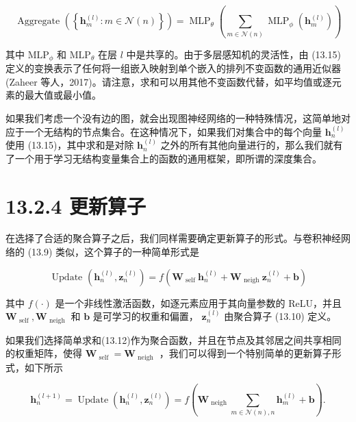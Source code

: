 \documentclass[10pt]{report}
\begin{document}
\[
\text{ Aggregate }\left( \left\{  {{\mathbf{h}}_{m}^{\left( l\right) } : m \in  \mathcal{N}\left( n\right) }\right\}  \right)  = {\operatorname{MLP}}_{\theta }\left( {\mathop{\sum }\limits_{{m \in  \mathcal{N}\left( n\right) }}{\operatorname{MLP}}_{\phi }\left( {\mathbf{h}}_{m}^{\left( l\right) }\right) }\right)  \tag{13.15}
\]

其中 \({\mathrm{{MLP}}}_{\phi }\) 和 \({\mathrm{{MLP}}}_{\theta }\) 在层 \(l\) 中是共享的。由于多层感知机的灵活性，由 (13.15) 定义的变换表示了任何将一组嵌入映射到单个嵌入的排列不变函数的通用近似器(Zaheer 等人，2017)。请注意，求和可以用其他不变函数代替，如平均值或逐元素的最大值或最小值。

如果我们考虑一个没有边的图，就会出现图神经网络的一种特殊情况，这简单地对应于一个无结构的节点集合。在这种情况下，如果我们对集合中的每个向量 \({\mathbf{h}}_{n}^{\left( l\right) }\) 使用 (13.15)，其中求和是对除 \({\mathbf{h}}_{n}^{\left( l\right) }\) 之外的所有其他向量进行的，那么我们就有了一个用于学习无结构变量集合上的函数的通用框架，即所谓的深度集合。

\section*{13.2.4 更新算子}

在选择了合适的聚合算子之后，我们同样需要确定更新算子的形式。与卷积神经网络的 (13.9) 类似，这个算子的一种简单形式是

\[
\text{ Update }\left( {{\mathbf{h}}_{n}^{\left( l\right) },{\mathbf{z}}_{n}^{\left( l\right) }}\right)  = f\left( {{\mathbf{W}}_{\text{ self }}{\mathbf{h}}_{n}^{\left( l\right) } + {\mathbf{W}}_{\text{ neigh }}{\mathbf{z}}_{n}^{\left( l\right) } + \mathbf{b}}\right)  \tag{13.16}
\]

其中 \(f\left( \cdot \right)\) 是一个非线性激活函数，如逐元素应用于其向量参数的 ReLU，并且 \({\mathbf{W}}_{\text{ self }},{\mathbf{W}}_{\text{ neigh }}\) 和 \(\mathbf{b}\) 是可学习的权重和偏置， \({\mathbf{z}}_{n}^{\left( l\right) }\) 由聚合算子 (13.10) 定义。

如果我们选择简单求和(13.12)作为聚合函数，并且在节点及其邻居之间共享相同的权重矩阵，使得 \({\mathbf{W}}_{\text{ self }} = {\mathbf{W}}_{\text{ neigh }}\) ，我们可以得到一个特别简单的更新算子形式，如下所示

\[
{\mathbf{h}}_{n}^{\left( l + 1\right) } = \operatorname{Update}\left( {{\mathbf{h}}_{n}^{\left( l\right) },{\mathbf{z}}_{n}^{\left( l\right) }}\right)  = f\left( {{\mathbf{W}}_{\text{ neigh }}\mathop{\sum }\limits_{{m \in  \mathcal{N}\left( n\right) ,n}}{\mathbf{h}}_{m}^{\left( l\right) } + \mathbf{b}}\right) . \tag{13.17}
\]
\end{document}

